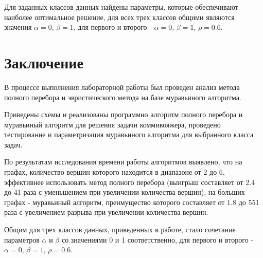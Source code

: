 \documentclass[12pt]{report}
\begin{document}
	Для заданных классов данных найдены параметры, которые обеспечивают наиболее оптимальное решение, для всех трех классов общими являются значения $\alpha = 0$, $\beta = 1$, для первого и второго - $\alpha = 0$, $\beta = 1$, $\rho = 0.6$.
	\newpage
	
	\chapter*{Заключение}
	В процессе выполнения лабораторной работы был проведен анализ метода полного перебора и эвристического метода на базе муравьиного алгоритма.
	
	Приведены схемы и реализованы программно алгоритм полного перебора и муравьиный алгоритм для решения задачи коммивояжера, проведено тестирование и параметризация муравьиного алгоритма для выбранного класса задач.
	
	По результатам исследования времени работы алгоритмов выявлено, что на графах, количество вершин которого находится в диапазоне от 2 до 6, эффективнее использовать метод полного перебора (выигрыш составляет от 2.4 до 41 раза с уменьшением при увеличении количества вершин), на больших графах - муравьиный алгоритм, преимущество которого составляет от 1.8 до 551 раза с увеличением разрыва при увеличении количества вершин.
	
	Общим для трех классов данных, приведенных в работе, стало сочетание параметров $\alpha$ и $\beta$ со значениями 0 и 1 соответственно, для первого и второго - $\alpha = 0$, $\beta = 1$, $\rho = 0.6$.
	\newpage
	
	
	
	\nocite{*}
\end{document}
